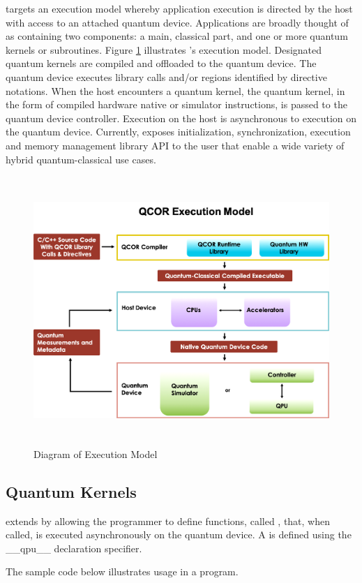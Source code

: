 \qcor targets an execution model whereby application execution is directed by the host with access to an attached quantum device. Applications are broadly thought of as containing two components: a main, classical part, and one or more quantum kernels or subroutines. Figure \ref{fig:exec_model} illustrates \qcor's execution model. Designated quantum kernels are compiled and offloaded to the quantum device. The quantum device executes \qcor library calls and/or \qcor regions identified by directive notations. When the host encounters a quantum kernel, the quantum kernel, in the form of compiled hardware native or simulator 
instructions, is passed to the quantum device controller. Execution on the host is asynchronous to execution on the quantum device. 
Currently, \qcor exposes initialization, synchronization, execution and memory management library \ac{API} to the user that enable a wide variety of hybrid quantum-classical use cases.

\begin{figure}
 \centering
 \includegraphics[width=5in,height=4in]{figures/Execution_Model_Illustration_v3.png}
  \caption{Diagram of \qcor Execution Model}
  \label{fig:exec_model}
\end{figure}


\subsection{\textbf{Quantum Kernels}}\label{subsec:kernel}
\qcor extends \CorCpp by allowing the programmer to define functions, called , that, when called, is executed asynchronously on the quantum device. A  is defined using the __qpu__ declaration specifier. 

The sample code below illustrates  usage in a \CorCpp program.

